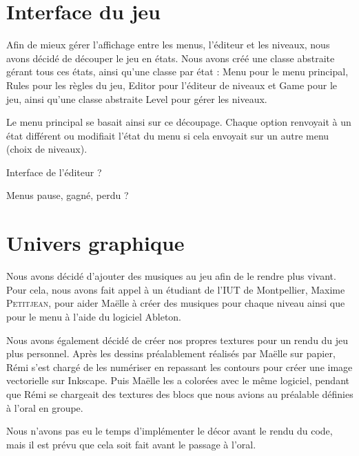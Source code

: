 \section{Interface du jeu}

Afin de mieux gérer l'affichage entre les menus, l'éditeur et les
niveaux, nous avons décidé de découper le jeu en états. Nous avons
créé une classe abstraite gérant tous ces états, ainsi qu'une
classe par état : Menu pour le menu principal, Rules pour les
règles du jeu, Editor pour l'éditeur de niveaux et Game pour
le jeu, ainsi qu'une classe abstraite Level pour gérer les niveaux.

Le menu principal se basait ainsi sur ce découpage. Chaque option
renvoyait à un état différent ou modifiait l'état du menu si cela
envoyait sur un autre menu (choix de niveaux).

Interface de l'éditeur ?

Menus pause, gagné, perdu ?

\section{Univers graphique}

Nous avons décidé d'ajouter des musiques au jeu afin de le rendre
plus vivant. Pour cela, nous avons fait appel à un étudiant de
l'IUT de Montpellier, Maxime \textsc{Petitjean}, pour aider Maëlle
à créer des musiques pour chaque niveau ainsi que pour le menu
à l'aide du logiciel Ableton.

Nous avons également décidé de créer nos propres textures pour un
rendu du jeu plus personnel. Après les dessins préalablement
réalisés par Maëlle sur papier, Rémi s'est chargé de les numériser
en repassant les contours pour créer une image vectorielle sur
Inkscape. Puis Maëlle les a colorées avec le même logiciel,
pendant que Rémi se chargeait des textures des blocs que nous
avions au préalable définies à l'oral en groupe.

Nous n'avons pas eu le temps d'implémenter le décor avant le rendu
du code, mais il est prévu que cela soit fait avant le passage à l'oral.
